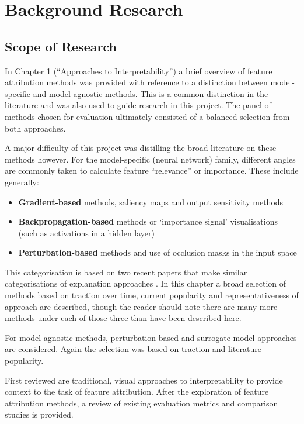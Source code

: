 \documentclass[main]{subfiles}
\begin{document}
\chapter{Background Research}

\section{Scope of Research} \label{sec:scoperesearch}

In Chapter 1 (``Approaches to Interpretability'') a brief overview of feature attribution methods was provided with reference to a distinction between model-specific and model-agnostic methods. This is a common distinction in the literature and was also used to guide research in this project. The panel of methods chosen for evaluation ultimately consisted of a balanced selection from both approaches. 

A major difficulty of this project was distilling the broad literature on these methods however. For the model-specific (neural network) family, different angles are commonly taken to calculate feature ``relevance'' or importance. These include generally:
\begin{itemize}
\item \textbf{Gradient-based} methods, saliency maps and output sensitivity methods
\item \textbf{Backpropagation-based} methods or `importance signal' visualisations (such as activations in a hidden layer)
\item \textbf{Perturbation-based} methods and use of occlusion masks in the input space
\end{itemize}

This categorisation is based on two recent papers that make similar categorisations of explanation approaches  \cite{deeplift} \cite{patternnet}. In this chapter a broad selection of methods based on traction over time, current popularity and representativeness of approach are described, though the reader should note there are many more methods under each of those three than have been described here.

For model-agnostic methods, perturbation-based and surrogate model approaches are considered. Again the selection was based on traction and literature popularity.

First reviewed are traditional, visual approaches to interpretability to provide context to the task of feature attribution. After the exploration of feature attribution methods, a review of existing evaluation metrics and comparison studies is provided.
\end{document}

